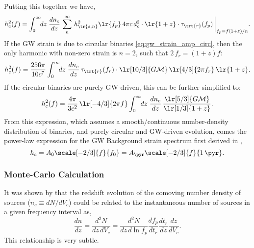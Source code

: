 \documentclass[10pt, oneside, onecolumn]{article}   	%
\newcommand{\hsn}{h_\tr{s,n}}
\newcommand{\thard}{\tau_\trt{r}}
\begin{document}
                Putting this together we have,
                \begin{equation}
                    h_c^2(f) = \int_0^\infty \!\! dz \; \frac{dn_c}{dz} \, \sum_n^\infty \, \hsn^2\lr{f_p} \, 4\pi c \, d_c^2 \cdot \lr{1+z} \cdot \thard(f_p) \, \bigg|_{f_p = f(1+z)/n}.
                \end{equation}
                If the GW strain is due to circular binaries \eqref{eq:gw_strain_amp_circ}, then the only harmonic with non-zero strain is $n=2$, such that $2 \, f_r = (1+z) f$:
                \begin{equation}
                    h_c^2(f) = \frac{256 \pi}{10 c^7} \int_0^\infty \!\! dz \; \frac{dn_c}{dz} \, \thard(f_r) \cdot \lr[10/3]{G \mathcal{M}} \, \lr[4/3]{2\pi f_r} \, \lr{1+z}.
                \end{equation}
                If the circular binaries are purely GW-driven, this can be further simplified to:
                \begin{equation}
                    h_c^2(f) = \frac{4 \pi}{3 c^2} \, \lr[-4/3]{2\pi f} \int_0^\infty \!\! dz \; \frac{dn_c}{dz}  \, \frac{\lr[5/3]{G \mathcal{M}}}{\lr[1/3]{1+z}}.
                \end{equation}
                From this expression, which assumes a smooth/continuous number-density distribution of binaries, and purely circular and GW-driven evolution, comes the power-law expression for the GW Background strain spectrum first derived in \citep[][Eq.~11]{Phinney-2001},
                \begin{equation}
                    h_c = A_0 \scale[-2/3]{f}{f_0} = A_{\pyr} \scale[-2/3]{f}{1 \, \pyr}.
                \end{equation}



            \subsubsection{Monte-Carlo Calculation}

                It was shown by \citet[][Eq.~6]{sesana2008} that the redshift evolution of the comoving number density of sources ($n_c \equiv dN/dV_c$) could be related to the instantaneous number of sources in a given frequency interval as,
                \begin{equation}
                    \label{eq:number_density_to_number_frequency}
                    \frac{dn}{dz} = \frac{d^2N}{dz \, dV_c} = \frac{d^2N}{dz \, d\ln f_p} \frac{d f_p}{dt_r} \frac{dt_r}{dz} \frac{dz}{dV_c}.
                \end{equation}
                This relationship is very subtle. \\
\end{document}
